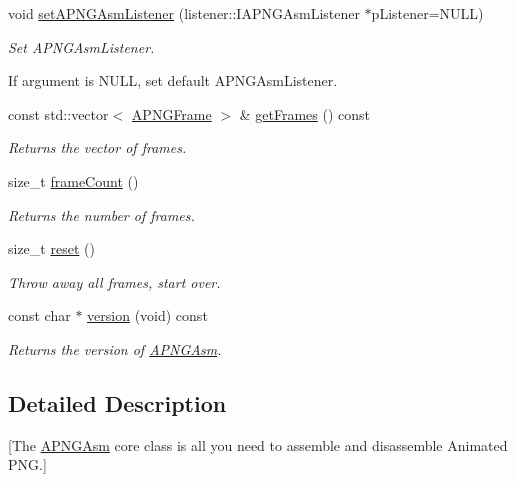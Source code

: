 \begin{DoxyCompactItemize}
void \hyperlink{classapngasm_1_1APNGAsm_a9077ec06f0f271d1719e868b93a3a703}{set\-A\-P\-N\-G\-Asm\-Listener} (listener\-::\-I\-A\-P\-N\-G\-Asm\-Listener $\ast$p\-Listener=N\-U\-L\-L)
\begin{DoxyCompactList}\small\item\em Set A\-P\-N\-G\-Asm\-Listener.\par
 If argument is N\-U\-L\-L, set default A\-P\-N\-G\-Asm\-Listener. \end{DoxyCompactList}\item 
const std\-::vector$<$ \hyperlink{classapngasm_1_1APNGFrame}{A\-P\-N\-G\-Frame} $>$ \& \hyperlink{classapngasm_1_1APNGAsm_a7533862bb9fae0c1fe9c16d3887eb5a2}{get\-Frames} () const 
\begin{DoxyCompactList}\small\item\em Returns the vector of frames. \end{DoxyCompactList}\item 
size\-\_\-t \hyperlink{classapngasm_1_1APNGAsm_aa8386d242540399c9c48cef6841feae3}{frame\-Count} ()
\begin{DoxyCompactList}\small\item\em Returns the number of frames. \end{DoxyCompactList}\item 
size\-\_\-t \hyperlink{classapngasm_1_1APNGAsm_a01763c8cd76b6ed61309b50cf1060e03}{reset} ()
\begin{DoxyCompactList}\small\item\em Throw away all frames, start over. \end{DoxyCompactList}\item 
const char $\ast$ \hyperlink{classapngasm_1_1APNGAsm_ac021e490af5e73353d1efbc5c1216637}{version} (void) const 
\begin{DoxyCompactList}\small\item\em Returns the version of \hyperlink{classapngasm_1_1APNGAsm}{A\-P\-N\-G\-Asm}. \end{DoxyCompactList}\end{DoxyCompactItemize}


\subsection{Detailed Description}
\mbox{[}The \hyperlink{classapngasm_1_1APNGAsm}{A\-P\-N\-G\-Asm} core class is all you need to assemble and disassemble Animated P\-N\-G.\mbox{]} 

